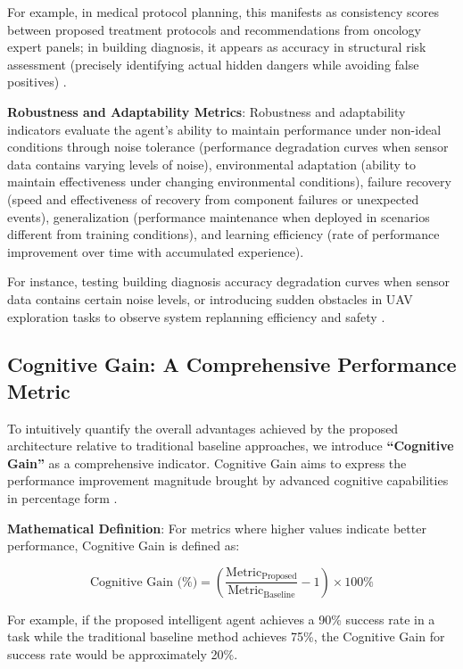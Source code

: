 For example, in medical protocol planning, this manifests as consistency scores between proposed treatment protocols and recommendations from oncology expert panels; in building diagnosis, it appears as accuracy in structural risk assessment (precisely identifying actual hidden dangers while avoiding false positives) \cite{rasheed2020digital}.

\textbf{Robustness and Adaptability Metrics}: Robustness and adaptability indicators evaluate the agent's ability to maintain performance under non-ideal conditions through noise tolerance (performance degradation curves when sensor data contains varying levels of noise), environmental adaptation (ability to maintain effectiveness under changing environmental conditions), failure recovery (speed and effectiveness of recovery from component failures or unexpected events), generalization (performance maintenance when deployed in scenarios different from training conditions), and learning efficiency (rate of performance improvement over time with accumulated experience).

For instance, testing building diagnosis accuracy degradation curves when sensor data contains certain noise levels, or introducing sudden obstacles in UAV exploration tasks to observe system replanning efficiency and safety \cite{grande2012scan}.

\subsection{Cognitive Gain: A Comprehensive Performance Metric}

To intuitively quantify the overall advantages achieved by the proposed architecture relative to traditional baseline approaches, we introduce \textbf{``Cognitive Gain''} as a comprehensive indicator. Cognitive Gain aims to express the performance improvement magnitude brought by advanced cognitive capabilities in percentage form \cite{stone2016artificial}.

\textbf{Mathematical Definition}: For metrics where higher values indicate better performance, Cognitive Gain is defined as:

\begin{equation}
\text{Cognitive Gain (\%)} = \left(\frac{\text{Metric}_{\text{Proposed}}}{\text{Metric}_{\text{Baseline}}} - 1\right) \times 100\%
\end{equation}

For example, if the proposed intelligent agent achieves a 90\% success rate in a task while the traditional baseline method achieves 75\%, the Cognitive Gain for success rate would be approximately 20\%.

